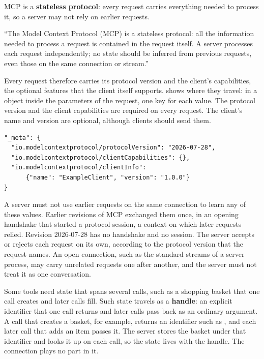 MCP is a \textbf{stateless protocol}: every request carries everything needed to process it, so a
server may not rely on earlier requests.

\begin{definition}
\label{def:mcpcontract-stateless}
``The Model Context Protocol (MCP) is a stateless protocol: all the information needed to process a
request is contained in the request itself. A server processes each request independently; no state
should be inferred from previous requests, even those on the same connection or stream.''
\citep{mcp-spec-2026}
\end{definition}

Every request therefore carries its protocol version and the client's capabilities, the optional
features that the client itself supports.  shows where they travel: in a
 object inside the parameters of the request, one key for each value. The protocol
version and the client capabilities are required on every request. The client's name and version
are optional, although clients should send them.

\noindent\begin{minipage}{\linewidth}
\begin{lstlisting}[basicstyle=\ttfamily\footnotesize, caption={The metadata carried in the
parameters of every request, as in the specification's own example.}, label=lst:mcpcontract-meta]
"_meta": {
  "io.modelcontextprotocol/protocolVersion": "2026-07-28",
  "io.modelcontextprotocol/clientCapabilities": {},
  "io.modelcontextprotocol/clientInfo":
      {"name": "ExampleClient", "version": "1.0.0"}
}
\end{lstlisting}
\end{minipage}

A server must not use earlier requests on the same connection to learn any of these values.
Earlier revisions of MCP exchanged them once, in an opening handshake that started a protocol
session, a context on which later requests relied. Revision 2026-07-28 has no handshake and no
session. The server accepts or rejects each request on its own, according to the protocol version
that the request names. An open connection, such as the standard streams of a server process, may
carry unrelated requests one after another, and the server must not treat it as one conversation.

Some tools need state that spans several calls, such as a shopping basket that one call creates and
later calls fill. Such state travels as a \textbf{handle}: an explicit identifier that one call
returns and later calls pass back as an ordinary argument. A call that creates a basket, for
example, returns an identifier such as , and each later call that adds an item
passes it. The server stores the basket under that identifier and looks it up on each call, so the
state lives with the handle. The connection plays no part in it.

